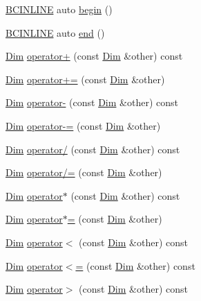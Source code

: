 \begin{DoxyCompactItemize}
\item 
\hyperlink{common_8h_a6699e8b0449da5c0fafb878e59c1d4b1}{B\+C\+I\+N\+L\+I\+NE} auto \hyperlink{structbc_1_1Dim_a6bb6f0694071dbb84f9f65d419a55b01}{begin} ()
\item 
\hyperlink{common_8h_a6699e8b0449da5c0fafb878e59c1d4b1}{B\+C\+I\+N\+L\+I\+NE} auto \hyperlink{structbc_1_1Dim_a1b236eb5f815625005ff5aded55b1465}{end} ()
\item 
\hyperlink{structbc_1_1Dim}{Dim} \hyperlink{structbc_1_1Dim_aea1cd55bade7411d37e9ad615c1d357e}{operator+} (const \hyperlink{structbc_1_1Dim}{Dim} \&other) const
\item 
\hyperlink{structbc_1_1Dim}{Dim} \hyperlink{structbc_1_1Dim_aa81e58af5e2bd8d6967bafc0d83210a4}{operator+=} (const \hyperlink{structbc_1_1Dim}{Dim} \&other)
\item 
\hyperlink{structbc_1_1Dim}{Dim} \hyperlink{structbc_1_1Dim_a5f72a7916d7bf666e2569dccef8277a8}{operator-\/} (const \hyperlink{structbc_1_1Dim}{Dim} \&other) const
\item 
\hyperlink{structbc_1_1Dim}{Dim} \hyperlink{structbc_1_1Dim_aebac2ecf4a2575ae37f3f95f1ebe3140}{operator-\/=} (const \hyperlink{structbc_1_1Dim}{Dim} \&other)
\item 
\hyperlink{structbc_1_1Dim}{Dim} \hyperlink{structbc_1_1Dim_a4726afdb4e1f21b759b16ef07bd0f60f}{operator/} (const \hyperlink{structbc_1_1Dim}{Dim} \&other) const
\item 
\hyperlink{structbc_1_1Dim}{Dim} \hyperlink{structbc_1_1Dim_a9bf1f0f74354070f8927a15f96faf158}{operator/=} (const \hyperlink{structbc_1_1Dim}{Dim} \&other)
\item 
\hyperlink{structbc_1_1Dim}{Dim} \hyperlink{structbc_1_1Dim_adfeffe31c92089b7bc7447415b95fc10}{operator$\ast$} (const \hyperlink{structbc_1_1Dim}{Dim} \&other) const
\item 
\hyperlink{structbc_1_1Dim}{Dim} \hyperlink{structbc_1_1Dim_afa8a30c0b12665058da861c31df813cd}{operator$\ast$=} (const \hyperlink{structbc_1_1Dim}{Dim} \&other)
\item 
\hyperlink{structbc_1_1Dim}{Dim} \hyperlink{structbc_1_1Dim_a8ae92350cf75b23f2845e4c708081798}{operator$<$} (const \hyperlink{structbc_1_1Dim}{Dim} \&other) const
\item 
\hyperlink{structbc_1_1Dim}{Dim} \hyperlink{structbc_1_1Dim_a04297e95814d27fee5009eac3ed82082}{operator$<$=} (const \hyperlink{structbc_1_1Dim}{Dim} \&other) const
\item 
\hyperlink{structbc_1_1Dim}{Dim} \hyperlink{structbc_1_1Dim_a2b626d552fe3b4a486b4f5456ba0acc1}{operator$>$} (const \hyperlink{structbc_1_1Dim}{Dim} \&other) const

\end{DoxyCompactItemize}
